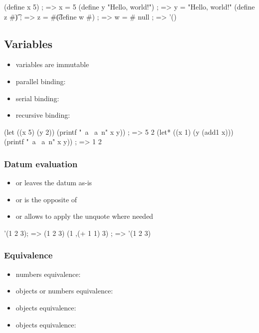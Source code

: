 \documentclass[a4paper,landscape,10pt]{article}
\begin{document}
\begin{multicols*}{2}
  \begin{racket}
(define x 5) ; => x = 5
(define y "Hello, world!") ; => y = "Hello, world!"
(define z #\t) ; => z = #\t
(define w #\A) ; => w = #\A
null ; => '()
\end{racket}

  \breakcolumn

  \subsection{Variables}

  \begin{itemize}
    \item variables are immutable
    \item parallel binding: 
    \item serial binding: 
    \item recursive binding: 
  \end{itemize}

  \begin{racket}
(let ((x 5) (y 2)) (printf "~a ~a~n" x y)) ; => 5 2
(let* ((x 1) (y (add1 x))) (printf "~a ~a~n" x y)) ; => 1 2
\end{racket}

  \subsubsection{Datum evaluation}

  \begin{itemize}
    \item {} or  leaves the datum as-is
    \item {} or  is the opposite of 
    \item {} or  allows to apply the unquote where needed
  \end{itemize}

  \begin{racket}
'(1 2 3); => (1 2 3)
(1 ,(+ 1 1) 3) ; => '(1 2 3)
  \end{racket}

  \subsubsection{Equivalence}

  \begin{itemize}
    \item numbers equivalence: \iracket{=}
    \item objects or numbers equivalence: 
    \item objects equivalence: 
    \item objects equivalence: 
  \end{itemize}


\end{multicols*}
\end{document}
